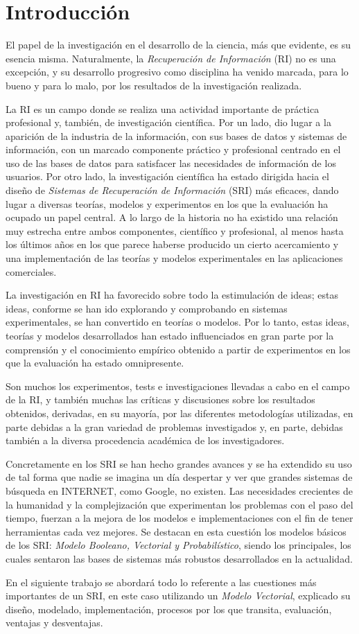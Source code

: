 \section{Introducción}\label{sec:intro}

El papel de la investigación en el desarrollo de la ciencia, más que evidente,
es su esencia misma. Naturalmente, la \emph{Recuperación de Información} (RI)
no es una excepción, y su desarrollo progresivo como disciplina ha venido
marcada, para lo bueno y para lo malo, por los resultados de la investigación
realizada.

La RI es un campo donde se realiza una actividad importante de práctica
profesional y, también, de investigación científica. Por un lado, dio lugar a
la aparición de la industria de la información, con sus bases de datos y
sistemas de información, con un marcado componente práctico y profesional
centrado en el uso de las bases de datos para satisfacer las necesidades de
información de los usuarios. Por otro lado, la investigación científica ha
estado dirigida hacia el diseño de \emph{Sistemas de Recuperación de
Información} (SRI) más eficaces, dando lugar a diversas teorías, modelos y
experimentos en los que la evaluación ha ocupado un papel central. A lo largo
de la historia no ha existido una relación muy estrecha entre ambos
componentes, científico y profesional, al menos hasta los últimos años en los
que parece haberse producido un cierto acercamiento y una implementación de
las teorías y modelos experimentales en las aplicaciones comerciales.

La investigación en RI ha favorecido sobre todo la estimulación de ideas; estas
ideas, conforme se han ido explorando y comprobando en sistemas experimentales,
se han convertido en teorías o modelos. Por lo tanto, estas ideas, teorías y
modelos desarrollados han estado influenciados en gran parte por la comprensión
y el conocimiento empírico obtenido a partir de experimentos en los que la
evaluación ha estado omnipresente.

Son muchos los experimentos, tests e investigaciones llevadas a cabo en el
campo de la RI, y también muchas las críticas y discusiones sobre los
resultados obtenidos, derivadas, en su mayoría, por las diferentes
metodologías utilizadas, en parte debidas a la gran variedad de problemas
investigados y, en parte, debidas también a la diversa procedencia académica
de los investigadores.

Concretamente en los SRI se han hecho grandes avances y se ha extendido su uso
de tal forma que nadie se imagina un día despertar y ver que grandes sistemas
de búsqueda en INTERNET, como Google, no existen. Las necesidades crecientes
de la humanidad y la complejización que experimentan los problemas con el paso
del tiempo, fuerzan a la mejora de los modelos e implementaciones con el fin
de tener herramientas cada vez mejores. Se destacan en esta cuestión los
modelos básicos de los SRI: \emph{Modelo Booleano, Vectorial y Probabilístico},
siendo los principales, los cuales sentaron las bases de sistemas más robustos
desarrollados en la actualidad.

En el siguiente trabajo se abordará todo lo referente a las cuestiones más
importantes de un SRI, en este caso utilizando un \emph{Modelo Vectorial},
explicado su diseño, modelado, implementación, procesos por los que transita,
evaluación, ventajas y desventajas.
